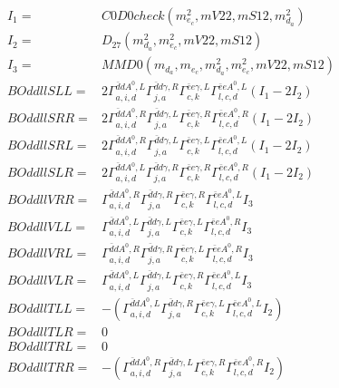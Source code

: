 \documentclass[A4,landscape]{article}
\begin{document}
\begin{align} 
I_1 = & C0D0check(m^2_{e_{{c}}}, mV22, mS12, m^2_{d_{{a}}}) \\ 
I_2 = & D_{27}(m^2_{d_{{a}}}, m^2_{e_{{c}}}, mV22, mS12) \\ 
I_3 = & MMD0(m_{d_{{a}}}, m_{e_{{c}}}, m^2_{d_{{a}}}, m^2_{e_{{c}}}, mV22, mS12) \\ 
  BOddllSLL= & 2  \Gamma^{\bar{d}d A^0 ,L}_{a, i, d} \Gamma^{\bar{d}d \gamma ,R}_{j, a} \Gamma^{\bar{e}e \gamma ,L}_{c, k} \Gamma^{\bar{e}e A^0 ,L}_{l, c, d} (I_1 - 2 I_2) \\ 
  BOddllSRR= & 2  \Gamma^{\bar{d}d A^0 ,R}_{a, i, d} \Gamma^{\bar{d}d \gamma ,L}_{j, a} \Gamma^{\bar{e}e \gamma ,R}_{c, k} \Gamma^{\bar{e}e A^0 ,R}_{l, c, d} (I_1 - 2 I_2) \\ 
  BOddllSRL= & 2  \Gamma^{\bar{d}d A^0 ,R}_{a, i, d} \Gamma^{\bar{d}d \gamma ,L}_{j, a} \Gamma^{\bar{e}e \gamma ,L}_{c, k} \Gamma^{\bar{e}e A^0 ,L}_{l, c, d} (I_1 - 2 I_2) \\ 
  BOddllSLR= & 2  \Gamma^{\bar{d}d A^0 ,L}_{a, i, d} \Gamma^{\bar{d}d \gamma ,R}_{j, a} \Gamma^{\bar{e}e \gamma ,R}_{c, k} \Gamma^{\bar{e}e A^0 ,R}_{l, c, d} (I_1 - 2 I_2) \\ 
  BOddllVRR= &  \Gamma^{\bar{d}d A^0 ,R}_{a, i, d} \Gamma^{\bar{d}d \gamma ,R}_{j, a} \Gamma^{\bar{e}e \gamma ,R}_{c, k} \Gamma^{\bar{e}e A^0 ,L}_{l, c, d} I_3 \\ 
  BOddllVLL= &  \Gamma^{\bar{d}d A^0 ,L}_{a, i, d} \Gamma^{\bar{d}d \gamma ,L}_{j, a} \Gamma^{\bar{e}e \gamma ,L}_{c, k} \Gamma^{\bar{e}e A^0 ,R}_{l, c, d} I_3 \\ 
  BOddllVRL= &  \Gamma^{\bar{d}d A^0 ,R}_{a, i, d} \Gamma^{\bar{d}d \gamma ,R}_{j, a} \Gamma^{\bar{e}e \gamma ,L}_{c, k} \Gamma^{\bar{e}e A^0 ,R}_{l, c, d} I_3 \\ 
  BOddllVLR= &  \Gamma^{\bar{d}d A^0 ,L}_{a, i, d} \Gamma^{\bar{d}d \gamma ,L}_{j, a} \Gamma^{\bar{e}e \gamma ,R}_{c, k} \Gamma^{\bar{e}e A^0 ,L}_{l, c, d} I_3 \\ 
  BOddllTLL= & -( \Gamma^{\bar{d}d A^0 ,L}_{a, i, d} \Gamma^{\bar{d}d \gamma ,R}_{j, a} \Gamma^{\bar{e}e \gamma ,L}_{c, k} \Gamma^{\bar{e}e A^0 ,L}_{l, c, d} I_2) \\ 
  BOddllTLR= & 0 \\ 
  BOddllTRL= & 0 \\ 
  BOddllTRR= & -( \Gamma^{\bar{d}d A^0 ,R}_{a, i, d} \Gamma^{\bar{d}d \gamma ,L}_{j, a} \Gamma^{\bar{e}e \gamma ,R}_{c, k} \Gamma^{\bar{e}e A^0 ,R}_{l, c, d} I_2) \\ 
\end{align} 
\end{document}
